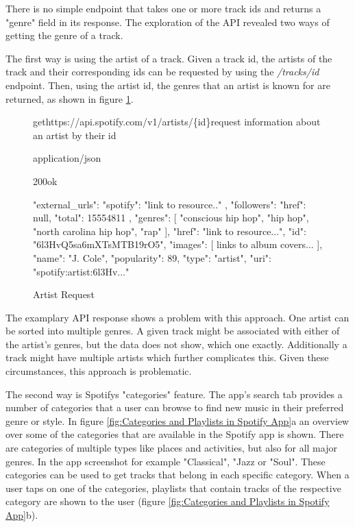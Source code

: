 There is no simple endpoint that takes one or more track ids and returns  a "genre" field
in its response. The exploration of the API revealed two ways of getting the genre of a track. 

The first way is using the artist of a track. Given a track id, the artists of the track and their corresponding
ids can be requested by using the \emph{/tracks/{id}} endpoint. Then, using the artist id, the genres that an
artist is known for are returned, as shown in figure \ref{fig:Artist Request}.

\begin{figure}[H]
    \caption{Artist Request}
	\label{fig:Artist Request}
\begin{apiRoute}{get}{https://api.spotify.com/v1/artists/\{id\}}{request information about an artist by their id}
    \begin{routeParameter}
    \end{routeParameter}
    \begin{routeResponse}{application/json}
        \begin{routeResponseItem}{200}{ok}
            \begin{routeResponseItemBody}
{
    "external_urls": {
        "spotify": "link to resource.."
    },
    "followers": {
        "href": null,
        "total": 15554811
    },
    "genres": [
        "conscious hip hop",
        "hip hop",
        "north carolina hip hop",
        "rap"
    ],
    "href": "link to resource...",
    "id": "6l3HvQ5sa6mXTsMTB19rO5",
    "images": [ links to album covers... ],
    "name": "J. Cole",
    "popularity": 89,
    "type": "artist",
    "uri": "spotify:artist:6l3Hv..."
}
            \end{routeResponseItemBody}
        \end{routeResponseItem}
    \end{routeResponse}
\end{apiRoute}
\end{figure}

The examplary API response shows a problem with this approach. One artist can be sorted
into multiple genres.
A given track might be associated with either of the artist's genres, but the data does
not show, which one exactly.
Additionally a track might have multiple artists which further complicates this.
Given these circumstances, this approach is problematic.

The second way is Spotifys "categories" feature. The app's search tab provides a number of
categories that a user can browse to find new music in their preferred genre or style.
In figure \ref{fig:Categories and Playlists in Spotify App}a an overview over some of the categories
that are available in the Spotify app is shown. There are categories of multiple types like
places and activities, but also for all major genres. In the app screenshot
for example "Classical", "Jazz or "Soul".
These categories can be used to get tracks that belong in each specific category. When a user taps on
one of the categories, playlists that contain tracks of the respective category are shown to the user
(figure \ref{fig:Categories and Playlists in Spotify App}b).


